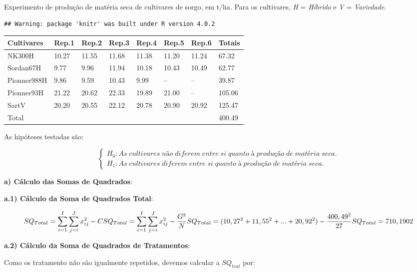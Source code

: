 \documentclass[
]{book}
\begin{document}
Experimento de produção de matéria seca de cultivares de sorgo, em t/ha. Para os cultivares, \emph{H} = \emph{Híbrido} e \emph{V} = \emph{Variedade}.

\begin{verbatim}
## Warning: package 'knitr' was built under R version 4.0.2
\end{verbatim}

\begin{table}[H]
\centering
\begin{tabular}{l|l|l|l|l|l|l|l}
\hline
Cultivares & Rep.1 & Rep.2 & Rep.3 & Rep.4 & Rep.5 & Rep.6 & Totais\\
\hline
NK300H & 10.27 & 11.55 & 11.68 & 11.38 & 11.20 & 11.24 & 67.32\\
\hline
Sordan67H & 9.77 & 9.96 & 11.94 & 10.18 & 10.43 & 10.49 & 62.77\\
\hline
Pionner988H & 9.86 & 9.59 & 10.43 & 9.99 & -- & -- & 39.87\\
\hline
Pionner93H & 21.22 & 20.62 & 22.33 & 19.89 & 21.00 & -- & 105.06\\
\hline
SartV & 20.20 & 20.55 & 22.12 & 20.78 & 20.90 & 20.92 & 125.47\\
\hline
Total &  &  &  &  &  &  & 400.49\\
\hline
\end{tabular}
\end{table}

As hipóteses testadas são:

\[
\begin{cases} H_0: As\;cultivares\; não\; diferem\; entre\; si\; quanto\; à\; produção\; de\; matéria\; seca.\\ 
H_1: As\;cultivares\; diferem\; entre\; si\; quanto\; à\; produção\; de\; matéria\; seca.
\end{cases}
\]

\textbf{a) Cálculo das Somas de Quadrados}:

\textbf{a.1) Cálculo da Soma de Quadrados Total}:

\[
SQ_{Total} = \sum_{i=1}^I\sum_{j=i}^Jx_{ij}^2 - C \\
SQ_{Total} = \sum_{i=1}^I\sum_{j=i}^Jx_{ij}^2 - \frac{G^2}{N} \\
SQ_{Total} = (10,27^2+11,55^2+...+20,92^2) - \frac{400,49^2}{27}\\
SQ_{Total} = 710,1902
\]

\textbf{a.2) Cálculo da Soma de Quadrados de Tratamentos}:

Como os tratamento não são igualmente repetidos, devemos calcular a \(SQ_{trat}\) por:
\end{document}
